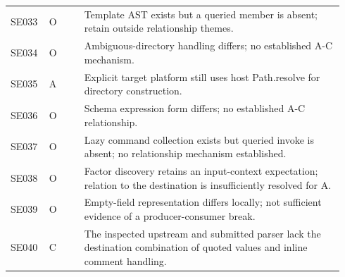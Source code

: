 \begin{longtable}{@{}p{0.10\linewidth}p{0.10\linewidth}p{0.74\linewidth}@{}}
SE033 & O & Template AST exists but a queried member is absent; retain outside relationship themes. \\
SE034 & O & Ambiguous-directory handling differs; no established A-C mechanism. \\
SE035 & A & Explicit target platform still uses host Path.resolve for directory construction. \\
SE036 & O & Schema expression form differs; no established A-C relationship. \\
SE037 & O & Lazy command collection exists but queried invoke is absent; no relationship mechanism established. \\
SE038 & O & Factor discovery retains an input-context expectation; relation to the destination is insufficiently resolved for A. \\
SE039 & O & Empty-field representation differs locally; not sufficient evidence of a producer-consumer break. \\
SE040 & C & The inspected upstream and submitted parser lack the destination combination of quoted values and inline comment handling. \\
\bottomrule\end{longtable}
\normalsize
